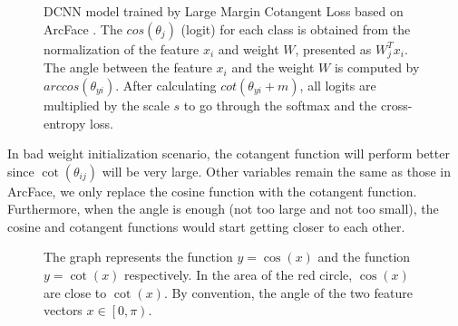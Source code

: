 \begin{figure}
    \centering
    
    \caption{DCNN model trained by Large Margin Cotangent Loss based on ArcFace \cite{deng2019arcface}. The $cos \left( \theta_j \right)$ (logit) for each class is obtained from the normalization of the feature $x_i$ and weight $W$, presented as $W_{j}^{T}x_{i}$. The angle between the feature $x_i$ and the weight $W$ is computed by $arccos \left( \theta_{yi} \right)$. After calculating $cot \left( \theta_{yi} + m \right)$, all logits are multiplied by the scale $s$ to go through the softmax and the cross-entropy loss. }
    \label{fig:my_label}
\end{figure}

In bad weight initialization scenario, the cotangent function will perform better since $\cot \left( {{\theta }_{ij}} \right)$ will be very large. Other variables remain the same as those in ArcFace, we only replace the cosine function with the cotangent function. Furthermore, when the angle is enough (not too large and not too small), the cosine and cotangent functions would start getting closer to each other.


\begin{figure}
\centering
        
    \caption{The graph represents the function $y=\cos \left( x \right)$ and the function $y=\cot \left( x \right)$ respectively. In the area of the red circle, $\cos \left( x \right)$ are close to $\cot \left( x \right)$. By convention, the angle of the two feature vectors $x\in \left[ 0,\pi  \right)$.}
    \label{figure02}

\end{figure}

